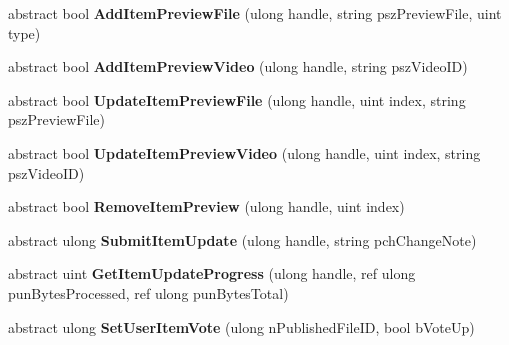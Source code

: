 \begin{DoxyCompactItemize}
abstract bool {\bfseries Add\+Item\+Preview\+File} (ulong handle, string psz\+Preview\+File, uint type)
\item 
\mbox{\label{class_valve_1_1_steamworks_1_1_i_steam_u_g_c_afae77ce32657b641328f7f32eaa6de04}} 
abstract bool {\bfseries Add\+Item\+Preview\+Video} (ulong handle, string psz\+Video\+ID)
\item 
\mbox{\label{class_valve_1_1_steamworks_1_1_i_steam_u_g_c_a3c39cd5ad4f969f18642ff225eadbda0}} 
abstract bool {\bfseries Update\+Item\+Preview\+File} (ulong handle, uint index, string psz\+Preview\+File)
\item 
\mbox{\label{class_valve_1_1_steamworks_1_1_i_steam_u_g_c_a855d35ffba92ac3b9d7e80886160e379}} 
abstract bool {\bfseries Update\+Item\+Preview\+Video} (ulong handle, uint index, string psz\+Video\+ID)
\item 
\mbox{\label{class_valve_1_1_steamworks_1_1_i_steam_u_g_c_aa5467343bab38d3d889e6930e4ac8455}} 
abstract bool {\bfseries Remove\+Item\+Preview} (ulong handle, uint index)
\item 
\mbox{\label{class_valve_1_1_steamworks_1_1_i_steam_u_g_c_ad151ceae82360c056b45471ed36c9380}} 
abstract ulong {\bfseries Submit\+Item\+Update} (ulong handle, string pch\+Change\+Note)
\item 
\mbox{\label{class_valve_1_1_steamworks_1_1_i_steam_u_g_c_aec8bb0670fbd731cf91098de73970b83}} 
abstract uint {\bfseries Get\+Item\+Update\+Progress} (ulong handle, ref ulong pun\+Bytes\+Processed, ref ulong pun\+Bytes\+Total)
\item 
\mbox{\label{class_valve_1_1_steamworks_1_1_i_steam_u_g_c_a33961ae12f529fca74760cda3121d90c}} 
abstract ulong {\bfseries Set\+User\+Item\+Vote} (ulong n\+Published\+File\+ID, bool b\+Vote\+Up)
\item 
\mbox{\label{class_valve_1_1_steamworks_1_1_i_steam_u_g_c_a14a5d58b24d5be46ac507a470d04ed71}} 

\end{DoxyCompactItemize}
